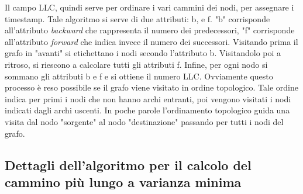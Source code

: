Il campo LLC, quindi serve per ordinare i vari cammini dei nodi, per assegnare i timestamp. Tale algoritmo si serve di due attributi: b, e f. "b" corrisponde all'attributo \textit{backward} che rappresenta il numero dei predecessori, "f" corrisponde all'attributo \textit{forward} che indica invece il numero dei successori. Visitando prima il grafo in "avanti" si etichettano i nodi secondo l'attributo b. Visitandolo poi a ritroso, si riescono a calcolare tutti gli attributi f. Infine, per ogni nodo si sommano gli attributi b e f e si ottiene il numero LLC. Ovviamente questo processo è reso possibile se il grafo viene visitato in ordine topologico. Tale ordine indica per primi i nodi che non hanno archi entranti, poi vengono visitati i nodi indicati dagli archi uscenti. In poche parole l'ordinamento topologico guida una visita dal nodo "sorgente" al nodo "destinazione" passando per tutti i nodi del grafo. 

\subsection{Dettagli dell'algoritmo per il calcolo del cammino più lungo a varianza minima}

